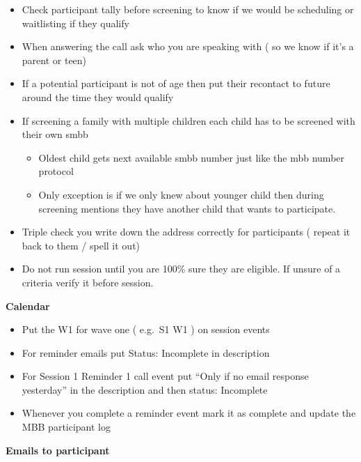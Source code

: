 \documentclass[]{book}
\providecommand{\tightlist}{%
  \setlength{\itemsep}{0pt}\setlength{\parskip}{0pt}}
\begin{document}
\begin{itemize}
\tightlist
\item
  Check participant tally before screening to know if we would be scheduling or waitlisting if they qualify
\item
  When answering the call ask who you are speaking with ( so we know if it's a parent or teen)
\item
  If a potential participant is not of age then put their recontact to future around the time they would qualify
\item
  If screening a family with multiple children each child has to be screened with their own smbb

  \begin{itemize}
  \tightlist
  \item
    Oldest child gets next available smbb number just like the mbb number protocol
  \item
    Only exception is if we only knew about younger child then during screening mentions they have another child that wants to participate.
  \end{itemize}
\item
  Triple check you write down the address correctly for participants ( repeat it back to them / spell it out)
\item
  Do not run session until you are 100\% sure they are eligible. If unsure of a criteria verify it before session.
\end{itemize}

\textbf{Calendar}

\begin{itemize}
\tightlist
\item
  Put the W1 for wave one ( e.g.~S1 W1 ) on session events
\item
  For reminder emails put Status: Incomplete in description
\item
  For Session 1 Reminder 1 call event put ``Only if no email response yesterday'' in the description and then status: Incomplete
\item
  Whenever you complete a reminder event mark it as complete and update the MBB participant log
\end{itemize}

\textbf{Emails to participant}
\end{document}
